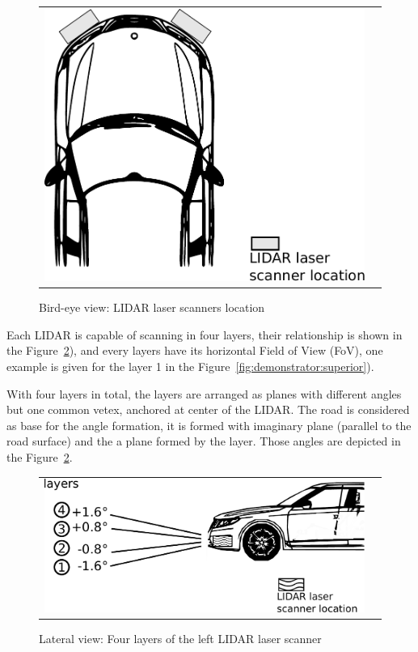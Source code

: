 \begin{figure}[h]
   \centering
     \begin{tabular}{lr}
       \includegraphics[scale=0.3]{img/fig:demonstrator:birdeye}
     \end{tabular}
   \caption{Bird-eye view: LIDAR laser scanners location}
   \label{fig:demonstrator:birdeye}
\end{figure}

Each LIDAR is capable of scanning in four layers, their relationship is shown  in the Figure~\ref{fig:demonstrator:lateral}), and every layers have its horizontal Field of View (FoV), one example is given for the layer 1 in the Figure~\ref{fig:demonstrator:superior}).

With four layers in total, the layers are arranged as planes with different angles but one common vetex, anchored at center of the LIDAR. The road is considered as base for the angle formation, it is formed with imaginary plane (parallel to the road surface) and the a plane formed by the layer. Those angles are depicted in the Figure~\ref{fig:demonstrator:lateral}.

\begin{figure}[h]
   \centering
     \begin{tabular}{lr}
       \includegraphics[scale=0.5]{img/fig:demonstrator:lateral}
     \end{tabular}
   \caption{Lateral view: Four layers of the left LIDAR laser scanner}
   \label{fig:demonstrator:lateral}
\end{figure}

